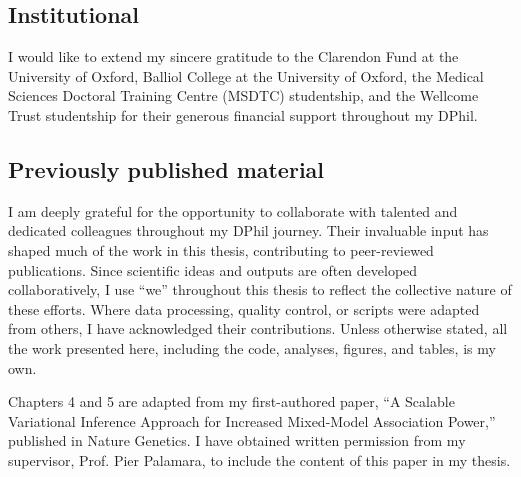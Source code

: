 \subsection*{Institutional}

I would like to extend my sincere gratitude to the Clarendon Fund at the University of Oxford, Balliol College at the University of Oxford, the Medical Sciences Doctoral Training Centre (MSDTC) studentship, and the Wellcome Trust studentship for their generous financial support throughout my DPhil.

\subsection*{Previously published material}
I am deeply grateful for the opportunity to collaborate with talented and dedicated colleagues throughout my DPhil journey. Their invaluable input has shaped much of the work in this thesis, contributing to peer-reviewed publications. Since scientific ideas and outputs are often developed collaboratively, I use ``we'' throughout this thesis to reflect the collective nature of these efforts. Where data processing, quality control, or scripts were adapted from others, I have acknowledged their contributions. Unless otherwise stated, all the work presented here, including the code, analyses, figures, and tables, is my own.

Chapters 4 and 5 are adapted from my first-authored paper, ``A Scalable Variational Inference Approach for Increased Mixed-Model Association Power,'' published in Nature Genetics. I have obtained written permission from my supervisor, Prof. Pier Palamara, to include the content of this paper in my thesis.
